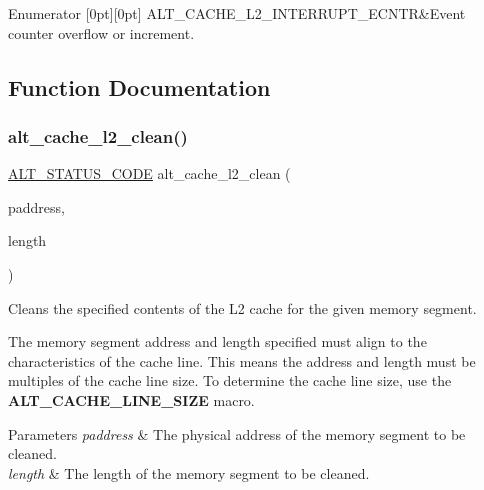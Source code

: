\begin{DoxyEnumFields}{Enumerator}
[0pt][0pt]{}\mbox{\label{group__CACHE__L2_gga84becd73f55dba868c78e0304d27ea39ae73a43b687754cd126140d5084b8233e}} 
A\+L\+T\+\_\+\+C\+A\+C\+H\+E\+\_\+\+L2\+\_\+\+I\+N\+T\+E\+R\+R\+U\+P\+T\+\_\+\+E\+C\+N\+TR&Event counter overflow or increment. \\
\hline

\end{DoxyEnumFields}


\subsection{Function Documentation}
\mbox{\label{group__CACHE__L2_ga3db8001307963ac2d2f0ff90e13ca884}} 
\subsubsection{\texorpdfstring{alt\_cache\_l2\_clean()}{alt\_cache\_l2\_clean()}}
{\footnotesize\ttfamily \mbox{\hyperlink{hwlib_8h_abdb0d369f069723ca55d6c94bcaaaa12}{A\+L\+T\+\_\+\+S\+T\+A\+T\+U\+S\+\_\+\+C\+O\+DE}} alt\+\_\+cache\+\_\+l2\+\_\+clean (\begin{DoxyParamCaption}\item[{void $\ast$}]{paddress,  }\item[{size\+\_\+t}]{length }\end{DoxyParamCaption})}

Cleans the specified contents of the L2 cache for the given memory segment.

The memory segment address and length specified must align to the characteristics of the cache line. This means the address and length must be multiples of the cache line size. To determine the cache line size, use the {\bfseries{A\+L\+T\+\_\+\+C\+A\+C\+H\+E\+\_\+\+L\+I\+N\+E\+\_\+\+S\+I\+ZE}} macro.


\begin{DoxyParams}{Parameters}
{\em paddress} & The physical address of the memory segment to be cleaned.\\
\hline
{\em length} & The length of the memory segment to be cleaned.\\
\hline
\end{DoxyParams}

